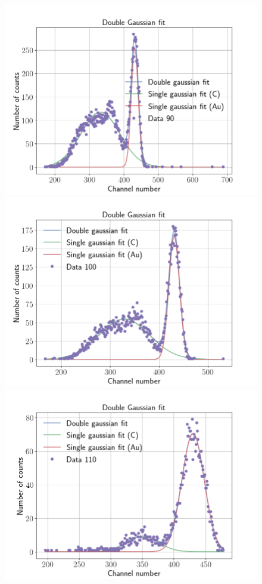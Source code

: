 \begin{figure}
\includegraphics[width=0.99\columnwidth]{Data_90}
\includegraphics[width=0.99\columnwidth]{Data_100}
\includegraphics[width=0.99\columnwidth]{Data_110}
\label{fig_angular_dependency}
\end{figure}

